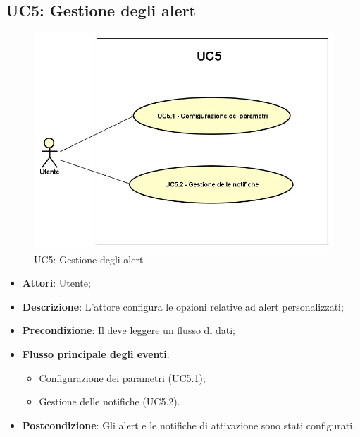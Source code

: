 \subsection{UC5: Gestione degli alert}
\hypertarget{UC5}{}
\begin{figure} [H]
 	\centering
 	\includegraphics[scale=0.45]{Img/UC5}
 	\caption{UC5: Gestione degli alert}\label{}
\end{figure}
\begin{itemize}
	\item \textbf{Attori}: Utente;
	\item \textbf{Descrizione}: L'attore configura le opzioni relative ad alert personalizzati;
	\item \textbf{Precondizione}: Il  deve leggere un flusso di dati;
	\item \textbf{Flusso principale degli eventi}:
		\begin{itemize}
			\item Configurazione dei parametri (UC5.1);
			\item Gestione delle notifiche (UC5.2).
		\end{itemize}
	\item \textbf{Postcondizione}: Gli alert e le notifiche di attivazione sono stati configurati.
\end{itemize}

